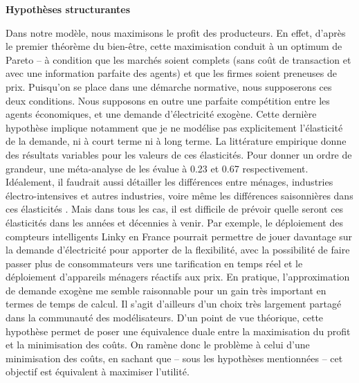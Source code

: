 \textbf{Hypothèses structurantes}

Dans notre modèle, nous maximisons le profit des producteurs. En effet, d’après le premier théorème du bien-être, cette maximisation conduit à un optimum de Pareto – à condition que les marchés soient complets (sans coût de transaction et avec une information parfaite des agents) et que les firmes soient preneuses de prix. Puisqu’on se place dans une démarche normative, nous supposerons ces deux conditions. 
Nous supposons en outre une parfaite compétition entre les agents économiques, et une demande d’électricité exogène. Cette dernière hypothèse implique notamment que je ne modélise pas explicitement l'élasticité de la demande, ni à court terme ni à long terme. La littérature empirique donne des résultats variables pour les valeurs de ces élasticités. Pour donner un ordre de grandeur, une méta-analyse de \citet{Labandeira2016} les évalue à 0.23 et 0.67 respectivement. Idéalement, il faudrait aussi détailler les différences entre ménages, industries électro-intensives et autres industries, voire même les différences saisonnières dans ces élasticités \citep{Fan2011}. Mais dans tous les cas, il est difficile de prévoir quelle seront ces élasticités dans les années et décennies à venir. Par exemple, le déploiement des compteurs intelligents Linky en France pourrait permettre de jouer davantage sur la demande d'électricité pour apporter de la flexibilité, avec la possibilité de faire passer plus de consommateurs vers une tarification en temps réel et le déploiement d'appareils ménagers réactifs aux prix.
En pratique, l'approximation de demande exogène me semble raisonnable pour un gain très important en termes de temps de calcul. Il s'agit d'ailleurs d'un choix très largement partagé dans la communauté des modélisateurs. D’un point de vue théorique, cette hypothèse permet de poser une équivalence duale entre la maximisation du profit et la minimisation des coûts. 
On ramène donc le problème à celui d’une minimisation des coûts, en sachant que – sous les hypothèses mentionnées – cet objectif est équivalent à maximiser l’utilité.

